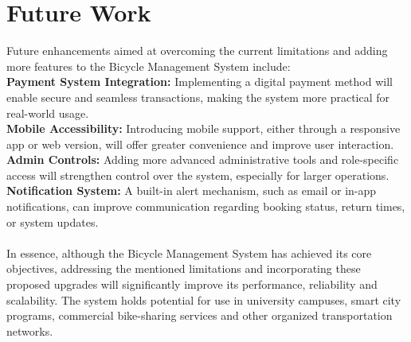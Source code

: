 \section{Future Work}
Future enhancements aimed at overcoming the current limitations and adding more features to the Bicycle Management System include: \\
\textbf{Payment System Integration:} Implementing a digital payment method will enable secure and seamless transactions, making the system more practical for real-world usage. \\
\textbf{Mobile Accessibility:} Introducing mobile support, either through a responsive app or web version, will offer greater convenience and improve user interaction.\\ 
\textbf{Admin Controls:} Adding more advanced administrative tools and role-specific access will strengthen control over the system, especially for larger operations. \\
\textbf{Notification System:} A built-in alert mechanism, such as email or in-app notifications, can improve communication regarding booking status, return times, or system updates.\cite{5.3.1} \\
\\
In essence, although the Bicycle Management System has achieved its core objectives, addressing the mentioned limitations and incorporating these proposed upgrades will significantly improve its performance, reliability and scalability. The system holds potential for use in university campuses, smart city programs, commercial bike-sharing services and other organized transportation networks.\cite{5.3.2}
